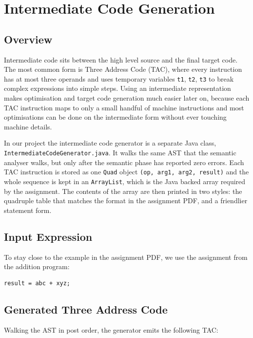 \documentclass[12pt,a4paper]{report}
\begin{document}
\chapter{Intermediate Code Generation}

\section{Overview}

Intermediate code sits between the high level source and the final target code. The most common form is Three Address Code (TAC), where every instruction has at most three operands and uses temporary variables \texttt{t1}, \texttt{t2}, \texttt{t3} to break complex expressions into simple steps. Using an intermediate representation makes optimisation and target code generation much easier later on, because each TAC instruction maps to only a small handful of machine instructions and most optimisations can be done on the intermediate form without ever touching machine details.

In our project the intermediate code generator is a separate Java class, \texttt{IntermediateCodeGenerator.java}. It walks the same AST that the semantic analyser walks, but only after the semantic phase has reported zero errors. Each TAC instruction is stored as one \texttt{Quad} object \texttt{(op, arg1, arg2, result)} and the whole sequence is kept in an \texttt{ArrayList}, which is the Java backed array required by the assignment. The contents of the array are then printed in two styles: the quadruple table that matches the format in the assignment PDF, and a friendlier statement form.

\section{Input Expression}

To stay close to the example in the assignment PDF, we use the assignment from the addition program:

\begin{verbatim}
result = abc + xyz;
\end{verbatim}

\section{Generated Three Address Code}

Walking the AST in post order, the generator emits the following TAC:
\end{document}
